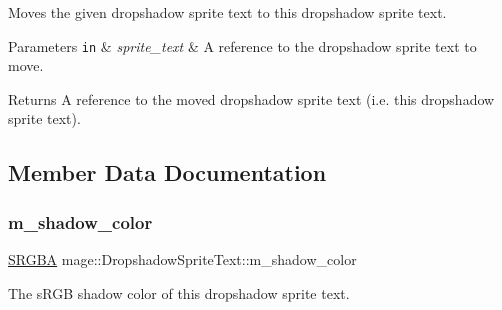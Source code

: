 Moves the given dropshadow sprite text to this dropshadow sprite text.


\begin{DoxyParams}[1]{Parameters}
\mbox{\tt in}  & {\em sprite\+\_\+text} & A reference to the dropshadow sprite text to move. \\
\hline
\end{DoxyParams}
\begin{DoxyReturn}{Returns}
A reference to the moved dropshadow sprite text (i.\+e. this dropshadow sprite text). 
\end{DoxyReturn}


\subsection{Member Data Documentation}
\hypertarget{classmage_1_1_dropshadow_sprite_text_a351565d8f023ddc53f486e048ad67e42}{}\label{classmage_1_1_dropshadow_sprite_text_a351565d8f023ddc53f486e048ad67e42} 
\subsubsection{\texorpdfstring{m\+\_\+shadow\+\_\+color}{m\_shadow\_color}}
{\footnotesize\ttfamily \hyperlink{structmage_1_1_s_r_g_b_a}{S\+R\+G\+BA} mage\+::\+Dropshadow\+Sprite\+Text\+::m\+\_\+shadow\+\_\+color\hspace{0.3cm}{\ttfamily [private]}}

The s\+R\+GB shadow color of this dropshadow sprite text. 